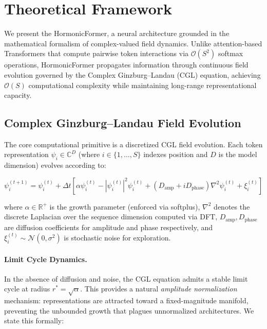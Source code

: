 \section{Theoretical Framework}
\label{sec:theory}

We present the HormonicFormer, a neural architecture grounded in the mathematical formalism of complex-valued field dynamics. Unlike attention-based Transformers that compute pairwise token interactions via $\mathcal{O}(S^2)$ softmax operations, HormonicFormer propagates information through continuous field evolution governed by the Complex Ginzburg--Landau (CGL) equation, achieving $\mathcal{O}(S)$ computational complexity while maintaining long-range representational capacity.

\subsection{Complex Ginzburg--Landau Field Evolution}

The core computational primitive is a discretized CGL field evolution. Each token representation $\psi_i \in \mathbb{C}^D$ (where $i \in \{1, \ldots, S\}$ indexes position and $D$ is the model dimension) evolves according to:

\begin{equation}
\psi_i^{(t+1)} = \psi_i^{(t)} + \Delta t \left[ \alpha \psi_i^{(t)} - |\psi_i^{(t)}|^2 \psi_i^{(t)} + (D_{\mathrm{amp}} + i D_{\mathrm{phase}}) \nabla^2 \psi_i^{(t)} + \xi_i^{(t)} \right]
\label{eq:cgl}
\end{equation}

where $\alpha \in \mathbb{R}^+$ is the growth parameter (enforced via softplus), $\nabla^2$ denotes the discrete Laplacian over the sequence dimension computed via DFT, $D_{\mathrm{amp}}, D_{\mathrm{phase}}$ are diffusion coefficients for amplitude and phase respectively, and $\xi_i^{(t)} \sim \mathcal{N}(0, \sigma^2)$ is stochastic noise for exploration.

\paragraph{Limit Cycle Dynamics.}
In the absence of diffusion and noise, the CGL equation admits a stable limit cycle at radius $r^* = \sqrt{\alpha}$. This provides a natural \emph{amplitude normalization} mechanism: representations are attracted toward a fixed-magnitude manifold, preventing the unbounded growth that plagues unnormalized architectures. We state this formally:

